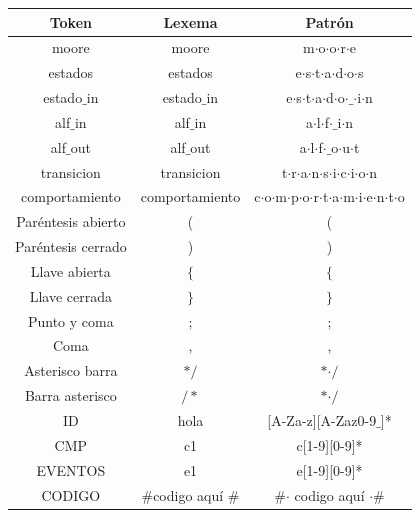 \documentclass[12pt,a4paper]{article}
\begin{document}
{	\begin{center}
		\begin{tabular}{|c|c|c|}
			\hline 
			\textbf{Token} & \textbf{Lexema} & \textbf{Patrón} \\ 
			\hline 
			moore & moore & m$\cdot$o$\cdot$o$\cdot$r$\cdot$e  \\ 
			\hline 
			estados &estados & e$\cdot$s$\cdot$t$\cdot$a$\cdot$d$\cdot$o$\cdot$s \\ 
			\hline 
			estado$\_$in & estado$\_$in & e$\cdot$s$\cdot$t$\cdot$a$\cdot$d$\cdot$o$\cdot$$\_$$\cdot$i$\cdot$n \\ 
			\hline 
			alf$\_$in	& alf$\_$in & a$\cdot$l$\cdot$f$\cdot$$\_$i$\cdot$n \\ 
			\hline 
				alf$\_$out	& alf$\_$out & a$\cdot$l$\cdot$f$\cdot$$\_$o$\cdot$u$\cdot$t \\ 
			\hline 
				transicion	& transicion & t$\cdot$r$\cdot$a$\cdot$n$\cdot$s$\cdot$i$\cdot$c$\cdot$i$\cdot$o$\cdot$n \\ 
			\hline 
				comportamiento	& comportamiento & c$\cdot$o$\cdot$m$\cdot$p$\cdot$o$\cdot$r$\cdot$t$\cdot$a$\cdot$m$\cdot$i$\cdot$e$\cdot$n$\cdot$t$\cdot$o \\ 
			\hline 
			Paréntesis abierto	& ( & ( \\ 
			\hline 
			Paréntesis cerrado	& ) & ) \\ 
			\hline 
			Llave abierta	& $\{$ & $\{$ \\ 
			\hline 
			Llave cerrada	& $\}$ & $\}$ \\ 
			\hline 
			Punto y coma	& ; & ; \\ 
			\hline 
			Coma	& , &  , \\ 
			\hline
			Asterisco barra & $\ast/$  & $\ast$$\cdot/$ \\ 
			\hline 
			Barra asterisco & $/\ast$  &  $\ast$$\cdot/$ \\ 
			\hline  
			ID	& hola  & [A-Za-z][A-Zaz0-9$\_$]* \\ 
			\hline 
			CMP	& c1 & c[1-9][0-9]* \\ 
			\hline
			EVENTOS	& e1  & e[1-9][0-9]* \\ 
			\hline
		    CODIGO	& $\#$codigo aquí $\#$  & $\#$$\cdot$ codigo aquí $\cdot$$\#$\\ 
			\hline
		\end{tabular} 	
	\end{center}
	\newpage
}
\end{document}
